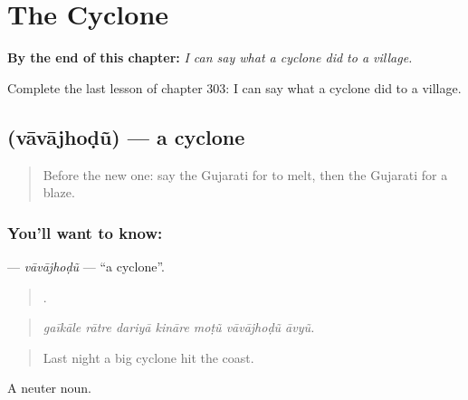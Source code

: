 
\chapter{The Cyclone}
\label{ch:gu-the-cyclone}

\begin{chapteropening}
\textbf{By the end of this chapter:} \emph{I can say what a cyclone did to a village.}

Complete the last lesson of chapter 303: I can say what a cyclone did to a village.
\end{chapteropening}

\section[\texorpdfstring{\gu{વાવાઝોડું} (vāvājhoḍũ)}{વાવાઝોડું (vāvājhoḍũ)}]{ (vāvājhoḍũ) — a cyclone}

\label{lesson:GU-C303-vavajhodu}



\begin{quote}
Before the new one: say the Gujarati for to melt, then the Gujarati for a blaze.
\end{quote}

\subsection*{You'll want to know: }
\textbf{} — \emph{vāvājhoḍũ} — \textquotedblleft{}a cyclone\textquotedblright{}.

\begin{quote}
      .
\end{quote}

\begin{quote}
\emph{gaīkāle rātre dariyā kināre moṭũ vāvājhoḍũ āvyũ.}
\end{quote}

\begin{quote}
Last night a big cyclone hit the coast.
\end{quote}

A neuter noun.


